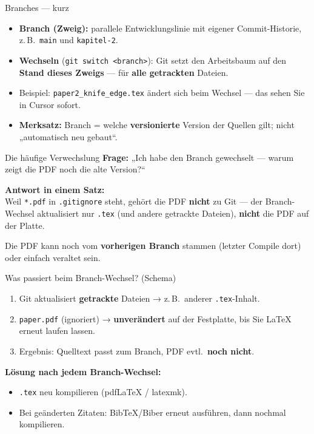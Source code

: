 \documentclass{beamer}
\begin{document}
\begin{frame}{Branches — kurz}
\begin{itemize}
\item \textbf{Branch (Zweig):} parallele Entwicklungslinie mit eigener Commit-Historie, z.\,B.\ \texttt{main} und \texttt{kapitel-2}.
\item \textbf{Wechseln} (\texttt{git switch <branch>}): Git setzt den Arbeitsbaum auf den \textbf{Stand dieses Zweigs} — für \textbf{alle getrackten} Dateien.
\item Beispiel: \texttt{paper2\_knife\_edge.tex} ändert sich beim Wechsel — das sehen Sie in Cursor sofort.
\item \textbf{Merksatz:} Branch = welche \textbf{versionierte} Version der Quellen gilt; nicht „automatisch neu gebaut“.
\end{itemize}
\end{frame}

\begin{frame}{Die häufige Verwechslung}
\textbf{Frage:} „Ich habe den Branch gewechselt — warum zeigt die PDF noch die alte Version?“

\vspace{0.5em}
\textbf{Antwort in einem Satz:}\\
Weil \texttt{*.pdf} in \texttt{.gitignore} steht, gehört die PDF \textbf{nicht} zu Git — der Branch-Wechsel aktualisiert nur \texttt{.tex} (und andere getrackte Dateien), \textbf{nicht} die PDF auf der Platte.

\vspace{0.5em}
Die PDF kann noch vom \textbf{vorherigen Branch} stammen (letzter Compile dort) oder einfach veraltet sein.
\end{frame}

\begin{frame}{Was passiert beim Branch-Wechsel? (Schema)}
\begin{enumerate}
\item Git aktualisiert \textbf{getrackte} Dateien → z.\,B.\ anderer \texttt{.tex}-Inhalt.
\item \texttt{paper.pdf} (ignoriert) → \textbf{unverändert} auf der Festplatte, bis Sie LaTeX erneut laufen lassen.
\item Ergebnis: Quelltext passt zum Branch, PDF evtl.\ \textbf{noch nicht}.
\end{enumerate}
\vspace{0.3em}
\textbf{Lösung nach jedem Branch-Wechsel:}
\begin{itemize}
\item \texttt{.tex} neu kompilieren (pdfLaTeX / latexmk).
\item Bei geänderten Zitaten: BibTeX/Biber erneut ausführen, dann nochmal kompilieren.
\end{itemize}
\end{frame}
\end{document}
